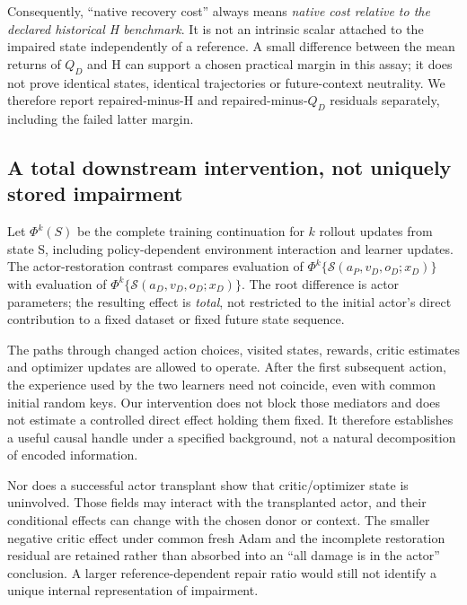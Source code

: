 Consequently, ``native recovery cost'' always means \emph{native cost relative to the declared historical H benchmark}. It is not an intrinsic scalar attached to the impaired state independently of a reference. A small difference between the mean returns of $Q_D$ and H can support a chosen practical margin in this assay; it does not prove identical states, identical trajectories or future-context neutrality. We therefore report repaired-minus-H and repaired-minus-$Q_D$ residuals separately, including the failed latter margin.

\subsection{A total downstream intervention, not uniquely stored impairment}\label{m:total_effect}
Let $\Phi^k(S)$ be the complete training continuation for $k$ rollout updates from state S, including policy-dependent environment interaction and learner updates. The actor-restoration contrast compares evaluation of $\Phi^k\{\mathcal S(a_P,v_D,o_D;x_D)\}$ with evaluation of $\Phi^k\{\mathcal S(a_D,v_D,o_D;x_D)\}$. The root difference is actor parameters; the resulting effect is \emph{total}, not restricted to the initial actor's direct contribution to a fixed dataset or fixed future state sequence.

The paths through changed action choices, visited states, rewards, critic estimates and optimizer updates are allowed to operate. After the first subsequent action, the experience used by the two learners need not coincide, even with common initial random keys. Our intervention does not block those mediators and does not estimate a controlled direct effect holding them fixed. It therefore establishes a useful causal handle under a specified background, not a natural decomposition of encoded information.

Nor does a successful actor transplant show that critic/optimizer state is uninvolved. Those fields may interact with the transplanted actor, and their conditional effects can change with the chosen donor or context. The smaller negative critic effect under common fresh Adam and the incomplete restoration residual are retained rather than absorbed into an ``all damage is in the actor'' conclusion. A larger reference-dependent repair ratio would still not identify a unique internal representation of impairment.
